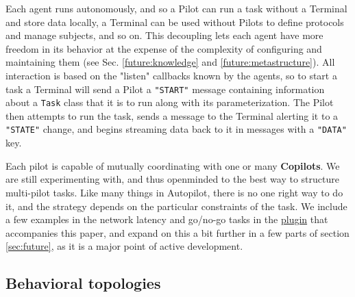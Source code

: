 Each agent runs autonomously, and so a Pilot can run a task without a Terminal and store data locally, a Terminal can be used without Pilots to define protocols and manage subjects, and so on. This decoupling lets each agent have more freedom in its behavior at the expense of the complexity of configuring and maintaining them (see Sec. \ref{future:knowledge} and \ref{future:metastructure}). All interaction is based on the "listen" callbacks known by the agents, so to start a task a Terminal will send a Pilot a \texttt{"START"} message containing information about a \texttt{Task} class that it is to run along with its parameterization. The Pilot then attempts to run the task, sends a message to the Terminal alerting it to a \texttt{"STATE"} change, and begins streaming data back to it in messages with a \texttt{"DATA"} key.

Each pilot is capable of mutually coordinating with one or many \textbf{Copilots}. We are still experimenting with, and thus openminded to the best way to structure multi-pilot tasks. Like many things in Autopilot, there is no one right way to do it, and the strategy depends on the particular constraints of the task. We include a few examples in the network latency and go/no-go tasks in the \href{https://wiki.auto-pi-lot.com/index.php/Plugin:Autopilot\_Paper}{plugin} that accompanies this paper, and expand on this a bit further in a few parts of section \ref{sec:future}, as it is a major point of active development.


\subsection{Behavioral topologies}
\label{sec:topology}

